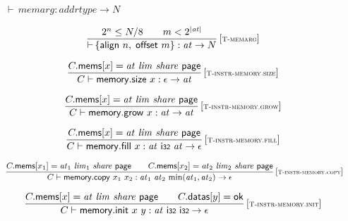 \vspace{1ex}

$\boxed{{\vdash}\, {\mathit{memarg}} : {\mathit{addrtype}} \rightarrow N}$

$$
\begin{array}{@{}c@{}}\displaystyle
\frac{
{2^{n}} \leq N / 8
 \qquad
m < {2^{{|{\mathit{at}}|}}}
}{
{\vdash}\, \{ \mathsf{align}~n,\;\allowbreak \mathsf{offset}~m \} : {\mathit{at}} \rightarrow N
} \, {[\textsc{\scriptsize T{-}memarg}]}
\qquad
\end{array}
$$

\vspace{1ex}

$$
\begin{array}{@{}c@{}}\displaystyle
\frac{
C{.}\mathsf{mems}{}[x] = {\mathit{at}}~{\mathit{lim}}~{\mathit{share}}~\mathsf{page}
}{
C \vdash \mathsf{memory{.}size}~x : \epsilon \rightarrow {\mathit{at}}
} \, {[\textsc{\scriptsize T{-}instr{-}memory.size}]}
\qquad
\end{array}
$$

$$
\begin{array}{@{}c@{}}\displaystyle
\frac{
C{.}\mathsf{mems}{}[x] = {\mathit{at}}~{\mathit{lim}}~{\mathit{share}}~\mathsf{page}
}{
C \vdash \mathsf{memory{.}grow}~x : {\mathit{at}} \rightarrow {\mathit{at}}
} \, {[\textsc{\scriptsize T{-}instr{-}memory.grow}]}
\qquad
\end{array}
$$

$$
\begin{array}{@{}c@{}}\displaystyle
\frac{
C{.}\mathsf{mems}{}[x] = {\mathit{at}}~{\mathit{lim}}~{\mathit{share}}~\mathsf{page}
}{
C \vdash \mathsf{memory{.}fill}~x : {\mathit{at}}~\mathsf{i{\scriptstyle 32}}~{\mathit{at}} \rightarrow \epsilon
} \, {[\textsc{\scriptsize T{-}instr{-}memory.fill}]}
\qquad
\end{array}
$$

$$
\begin{array}{@{}c@{}}\displaystyle
\frac{
C{.}\mathsf{mems}{}[x_1] = {\mathit{at}}_1~{\mathit{lim}}_1~{\mathit{share}}~\mathsf{page}
 \qquad
C{.}\mathsf{mems}{}[x_2] = {\mathit{at}}_2~{\mathit{lim}}_2~{\mathit{share}}~\mathsf{page}
}{
C \vdash \mathsf{memory{.}copy}~x_1~x_2 : {\mathit{at}}_1~{\mathit{at}}_2~{\mathrm{min}}({\mathit{at}}_1, {\mathit{at}}_2) \rightarrow \epsilon
} \, {[\textsc{\scriptsize T{-}instr{-}memory.copy}]}
\qquad
\end{array}
$$

$$
\begin{array}{@{}c@{}}\displaystyle
\frac{
C{.}\mathsf{mems}{}[x] = {\mathit{at}}~{\mathit{lim}}~{\mathit{share}}~\mathsf{page}
 \qquad
C{.}\mathsf{datas}{}[y] = \mathsf{ok}
}{
C \vdash \mathsf{memory{.}init}~x~y : {\mathit{at}}~\mathsf{i{\scriptstyle 32}}~\mathsf{i{\scriptstyle 32}} \rightarrow \epsilon
} \, {[\textsc{\scriptsize T{-}instr{-}memory.init}]}
\qquad
\end{array}
$$

